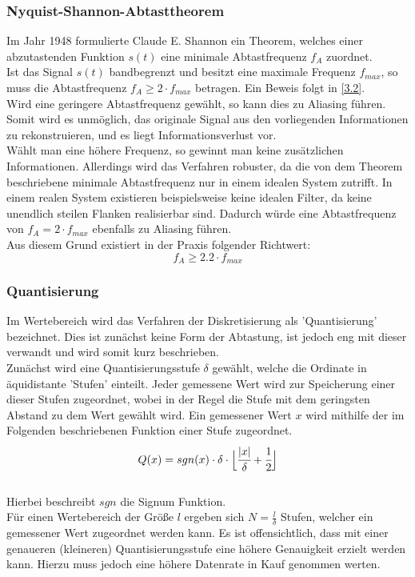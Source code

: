 \subsubsection{Nyquist-Shannon-Abtasttheorem}
\label{3.1.4}
Im Jahr 1948 formulierte Claude E. Shannon ein Theorem, welches einer abzutastenden Funktion $s(t)$ eine minimale Abtastfrequenz $f_A$ zuordnet.\\
Ist das Signal $s(t)$ bandbegrenzt und besitzt eine maximale Frequenz $f_{max}$, so muss die Abtastfrequenz $f_A \geq 2 \cdot f_{max}$ betragen. Ein Beweis folgt in \ref{3.2}.\\
Wird eine geringere Abtastfrequenz gewählt, so kann dies zu Aliasing führen. Somit wird es unmöglich, das originale Signal aus den vorliegenden Informationen zu rekonstruieren, und es liegt Informationsverlust vor.\\
Wählt man eine höhere Frequenz, so gewinnt man keine zusätzlichen Informationen. Allerdings wird das Verfahren robuster, da die von dem Theorem beschriebene minimale Abtastfrequenz nur in einem idealen System zutrifft. In einem realen System existieren beispielsweise keine idealen Filter, da keine unendlich steilen Flanken realisierbar sind. Dadurch würde eine Abtastfrequenz von $f_A = 2 \cdot f_{max}$ ebenfalls zu Aliasing führen.\\
Aus diesem Grund existiert in der Praxis folgender Richtwert:\\
$$f_A \geq 2.2 \cdot f_{max}$$


\subsubsection{Quantisierung}
\label{3.1.5}
Im Wertebereich wird das Verfahren der Diskretisierung als 'Quantisierung' bezeichnet. Dies ist zunächst keine Form der Abtastung, ist jedoch eng mit dieser verwandt und wird somit kurz beschrieben.\\

Zunächst wird eine Quantisierungsstufe $\delta$ gewählt, welche die Ordinate in äquidistante 'Stufen' einteilt. Jeder gemessene Wert wird zur Speicherung einer dieser Stufen zugeordnet, wobei in der Regel die Stufe mit dem geringsten Abstand zu dem Wert gewählt wird. Ein gemessener Wert $x$ wird mithilfe der im Folgenden beschriebenen Funktion einer Stufe zugeordnet.\\
$$Q(x) = sgn(x) \cdot \delta \cdot \Big\lfloor \cfrac{|x|}{\delta} + \cfrac{1}{2} \Big\rfloor $$\\
Hierbei beschreibt $sgn$ die Signum Funktion.\\
Für einen Wertebereich der Größe $l$ ergeben sich $N = \frac{l}{\delta}$ Stufen, welcher ein gemessener Wert zugeordnet werden kann. Es ist offensichtlich, dass mit einer genaueren (kleineren) Quantisierungsstufe eine höhere Genauigkeit erzielt werden kann. Hierzu muss jedoch eine höhere Datenrate in Kauf genommen werten.


